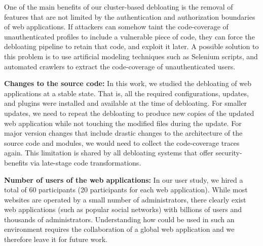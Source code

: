 One of the main benefits of our cluster-based debloating is the removal of features that are not limited by the authentication and authorization boundaries of web applications. 
If attackers can somehow taint the code-coverage of unauthenticated profiles to include a vulnerable piece of code, they can force the debloating pipeline to retain that code, and exploit it later. 
A possible solution to this problem is to use artificial modeling techniques such as Selenium scripts, and automated crawlers to extract the code-coverage of unauthenticated users. 

\noindent\textbf{Changes to the source code:} 
In this work, we studied the debloating of web applications at a stable state. 
That is, all the required configurations, updates, and plugins were installed and available at the time of debloating. 
For smaller updates, we need to repeat the debloating to produce new copies of the updated web application while not touching the modified files during the update. 
For major version changes that include drastic changes to the architecture of the source code and modules, we would need to collect the code-coverage traces again. This limitation is shared by all debloating systems that offer security-benefits via late-stage code transformations.

\noindent\textbf{Number of users of the web applications:} 
In our user study, we hired a total of 60 participants (20 participants for each web application). 
While most websites are operated by a small number of administrators, there clearly exist web applications (such as popular social networks) with billions of users and thousands of administrators. 
Understanding how \sys{} could be used in such an environment requires the collaboration of a global web application and we therefore leave it for future work.